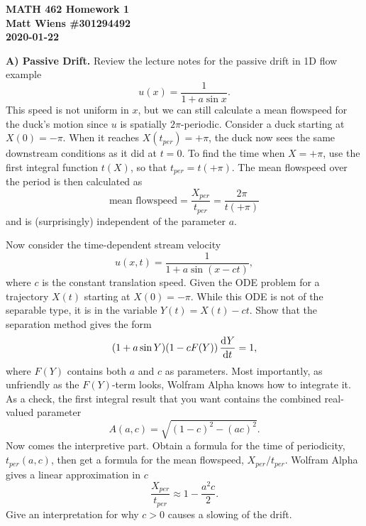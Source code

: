 \documentclass{article}
\begin{document}
\textbf{MATH 462 Homework 1} \\
\textbf{Matt Wiens \#301294492} \\
\textbf{2020-01-22}

\textbf{A) Passive Drift.} Review the lecture notes for the passive
drift in 1D flow example
%
\begin{equation*}
    u(x) = \frac{1}{1 + a \sin x}
    .
\end{equation*}
%
This speed is not uniform in $x$, but we can still calculate a mean
flowspeed for the duck's motion since $u$ is spatially $2 \pi$-periodic.
Consider a duck starting at $X(0) = - \pi$. When it reaches $X(t_{per})
= + \pi$, the duck now sees the same downstream conditions as it did at
$t = 0$. To find the time when $X = + \pi$, use the first integral
function $t(X)$, so that $t_{per} = t(+\pi)$. The mean flowspeed over
the period is then calculated as
%
\begin{equation*}
    \text{mean flowspeed} = \frac{X_{per}}{t_{per}} = \frac{2 \pi}{t (+ \pi)}
\end{equation*}
%
and is (surprisingly) independent of the parameter $a$.

Now consider the time-dependent stream velocity
%
\begin{equation*}
    u(x, t) = \frac{1}{1 + a \sin (x - c t)}
    ,
\end{equation*}
%
where $c$ is the constant translation speed. Given the ODE problem for a
trajectory $X(t)$ starting at $X(0) = - \pi$. While this ODE is not of
the separable type, it is in the variable $Y(t) = X(t) - c t$. Show that
the separation method gives the form
%
\begin{equation*}
    (1 + a \sin Y) (1 - c F(Y)) \dod{Y}{t} = 1
    ,
\end{equation*}
%
where $F(Y)$ contains both $a$ and $c$ as parameters. Most importantly,
as unfriendly as the $F(Y)$-term looks, Wolfram Alpha knows how to
integrate it. As a check, the first integral result that you want
contains the combined real-valued parameter
%
\begin{equation*}
    A(a, c) = \sqrt{(1 - c)^2 - (ac)^2}
    .
\end{equation*}
%
Now comes the interpretive part. Obtain a formula for the time of
periodicity, $t_{per}(a, c)$, then get a formula for the mean flowspeed,
$X_{per}/t_{per}$. Wolfram Alpha gives a linear approximation in $c$
%
\begin{equation*}
    \frac{X_{per}}{t_{per}} \approx 1 - \frac{a^2 c}{2}
    .
\end{equation*}
%
Give an interpretation for why $c > 0$ causes a slowing of the drift.
\end{document}
